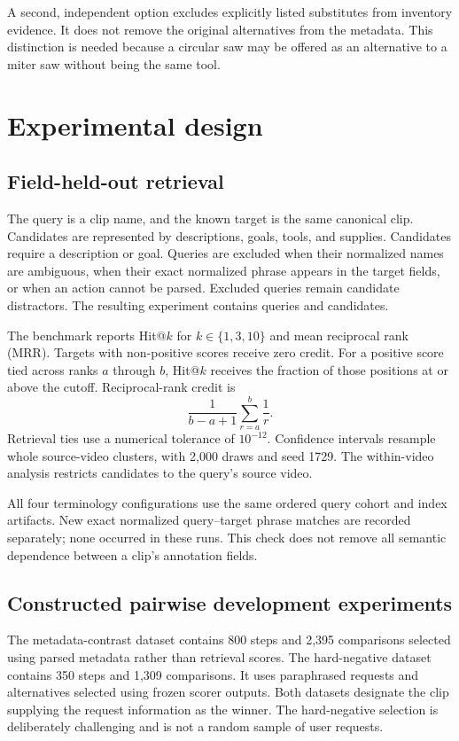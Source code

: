 \documentclass[11pt,letterpaper]{article}
\begin{document}
A second, independent option excludes explicitly listed substitutes from
inventory evidence. It does not remove the original alternatives from the
metadata. This distinction is needed because a circular saw may be offered as
an alternative to a miter saw without being the same tool.

\section{Experimental design}
\subsection{Field-held-out retrieval}
The query is a clip name, and the known target is the same canonical clip.
Candidates are represented by descriptions, goals, tools, and supplies.
Candidates require a description or goal. Queries are excluded when their
normalized names are ambiguous, when their exact normalized phrase appears
in the target fields, or when an action cannot be parsed. Excluded queries
remain candidate distractors. The resulting experiment contains
\QueryCount{} queries and \CandidateCount{} candidates.

The benchmark reports Hit@$k$ for $k\in\{1,3,10\}$ and mean reciprocal rank
(MRR). Targets with non-positive scores receive zero credit. For a positive
score tied across ranks $a$ through $b$, Hit@$k$ receives the fraction of those
positions at or above the cutoff. Reciprocal-rank credit is
\begin{equation}
 \frac{1}{b-a+1}\sum_{r=a}^{b}\frac{1}{r}.
\end{equation}
Retrieval ties use a numerical tolerance of $10^{-12}$. Confidence intervals
resample whole source-video clusters, with 2,000 draws and seed 1729. The
within-video analysis restricts candidates to the query's source video.

All four terminology configurations use the same ordered query cohort and
index artifacts. New exact normalized query--target phrase matches are
recorded separately; none occurred in these runs. This check does not remove
all semantic dependence between a clip's annotation fields.

\subsection{Constructed pairwise development experiments}
The metadata-contrast dataset contains 800 steps and 2,395 comparisons selected
using parsed metadata rather than retrieval scores. The hard-negative dataset
contains 350 steps and 1,309 comparisons. It uses paraphrased requests and
alternatives selected using frozen scorer outputs. Both datasets designate
the clip supplying the request information as the winner. The hard-negative
selection is deliberately challenging and is not a random sample of user
requests.
\end{document}
